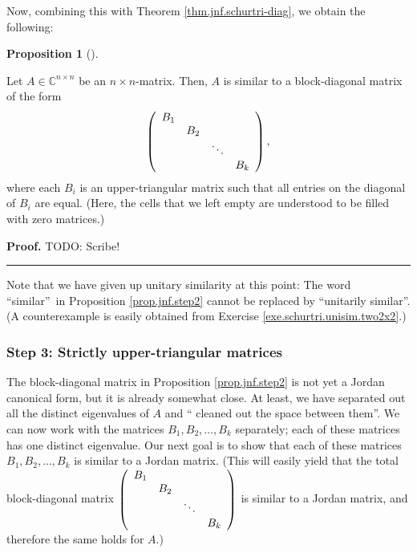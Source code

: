 \documentclass[numbers=enddot,12pt,final,onecolumn,notitlepage]{scrartcl}%
\numberwithin{exer}{subsection}
\theoremstyle{definition}
\newtheorem{prop}[theo]{Proposition}
\newenvironment{proposition}[1][]
{\begin{prop}[#1]\begin{leftbar}}
{\end{leftbar}\end{prop}}
\newenvironment{proof}[1][Proof]{\noindent\textbf{#1.} }{\ \rule{0.5em}{0.5em}}
\begin{document}
Now, combining this with Theorem \ref{thm.jnf.schurtri-diag}, we obtain the following:

\begin{proposition}
\label{prop.jnf.step2}Let $A\in\mathbb{C}^{n\times n}$ be an $n\times
n$-matrix. Then, $A$ is similar to a block-diagonal matrix of the form%
\[
\left(
\begin{array}
[c]{cccc}%
B_{1} &  &  & \\
& B_{2} &  & \\
&  & \ddots & \\
&  &  & B_{k}%
\end{array}
\right)  ,
\]
where each $B_{i}$ is an upper-triangular matrix such that all entries on the
diagonal of $B_{i}$ are equal. (Here, the cells that we left empty are
understood to be filled with zero matrices.)
\end{proposition}

\begin{proof}
TODO: Scribe!
\end{proof}

Note that we have given up unitary similarity at this point: The word
\textquotedblleft similar\textquotedblright\ in Proposition
\ref{prop.jnf.step2} cannot be replaced by \textquotedblleft unitarily
similar\textquotedblright. (A counterexample is easily obtained from Exercise
\ref{exe.schurtri.unisim.two2x2}.)

\subsubsection{\label{subsect.jnf.exist.step3}Step 3: Strictly
upper-triangular matrices}

The block-diagonal matrix in Proposition \ref{prop.jnf.step2} is not yet a
Jordan canonical form, but it is already somewhat close. At least, we have
separated out all the distinct eigenvalues of $A$ and \textquotedblleft
cleaned out the space between them\textquotedblright. We can now work with the
matrices $B_{1},B_{2},\ldots,B_{k}$ separately; each of these matrices has one
distinct eigenvalue. Our next goal is to show that each of these matrices
$B_{1},B_{2},\ldots,B_{k}$ is similar to a Jordan matrix. (This will easily
yield that the total block-diagonal matrix $\left(
\begin{array}
[c]{cccc}%
B_{1} &  &  & \\
& B_{2} &  & \\
&  & \ddots & \\
&  &  & B_{k}%
\end{array}
\right)  $ is similar to a Jordan matrix, and therefore the same holds for $A$.)
\end{document}
